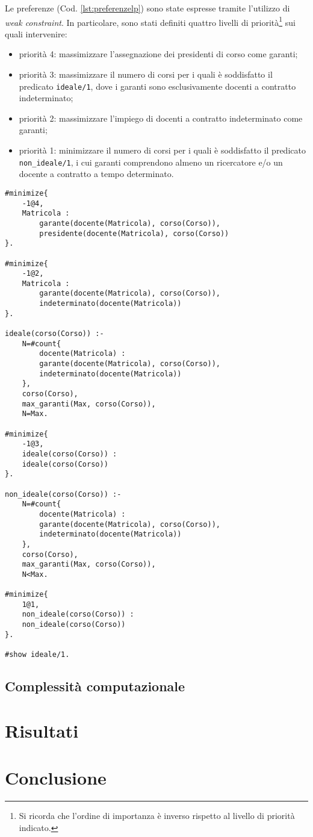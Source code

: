 \documentclass[journal]{IEEEtran}
\begin{document}
Le preferenze (Cod. \ref{lst:preferenzelp}) sono state espresse tramite l'utilizzo di \textit{weak constraint}. In particolare, sono stati definiti quattro livelli di priorità\footnote{Si ricorda che l'ordine di importanza è inverso rispetto al livello di priorità indicato.} sui quali intervenire:
\begin{itemize}
    \item priorità 4: massimizzare l'assegnazione dei presidenti di corso come garanti;
    \item priorità 3: massimizzare il numero di corsi per i quali è soddisfatto il predicato \texttt{ideale/1}, dove i garanti sono esclusivamente docenti a contratto indeterminato;
    \item priorità 2: massimizzare l'impiego di docenti a contratto indeterminato come garanti;
    \item priorità 1: minimizzare il numero di corsi per i quali è soddisfatto il predicato \texttt{non\_ideale/1}, i cui garanti comprendono almeno un ricercatore e/o un docente a contratto a tempo determinato.
\end{itemize}

\begin{center}
\begin{lstlisting}[style=asp, caption={Codice ASP del file \texttt{preferenze.lp}.}, label={lst:preferenzelp}]
#minimize{
	-1@4,
	Matricola :
		garante(docente(Matricola), corso(Corso)),
		presidente(docente(Matricola), corso(Corso))
}.

#minimize{
	-1@2,
	Matricola :
		garante(docente(Matricola), corso(Corso)),
		indeterminato(docente(Matricola))
}.

ideale(corso(Corso)) :-
	N=#count{
		docente(Matricola) :
		garante(docente(Matricola), corso(Corso)),
		indeterminato(docente(Matricola))
	},
	corso(Corso),
	max_garanti(Max, corso(Corso)),
	N=Max.

#minimize{
	-1@3,
	ideale(corso(Corso)) :
	ideale(corso(Corso))
}.

non_ideale(corso(Corso)) :-
	N=#count{
		docente(Matricola) :
		garante(docente(Matricola), corso(Corso)),
		indeterminato(docente(Matricola))
	},
	corso(Corso),
	max_garanti(Max, corso(Corso)),
	N<Max.

#minimize{
	1@1,
	non_ideale(corso(Corso)) :
	non_ideale(corso(Corso))
}.

#show ideale/1.
\end{lstlisting}
\end{center}



\subsection{Complessità computazionale}

\section{Risultati}

\section{Conclusione}



\end{document}
